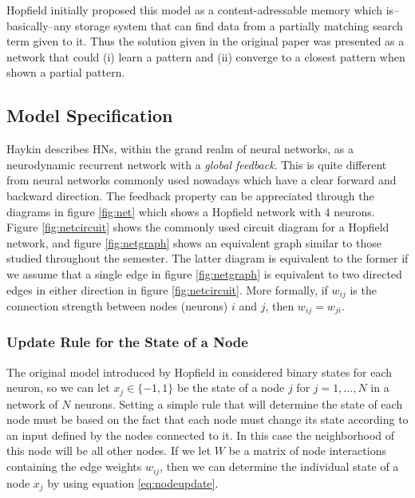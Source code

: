 \documentclass[11pt]{article}
\begin{document}
	Hopfield initially proposed this model as a content-adressable memory which is–basically–any storage system that can find data from a partially matching search term given to it.
	Thus the solution given in the original paper was presented as a network that could (i) learn a pattern and (ii) converge to a closest pattern when shown a partial pattern. 

	\subsection{Model Specification} 
	Haykin \cite{haykin} describes HNs, within the grand realm of neural networks, as a neurodynamic recurrent network with a \textit{global feedback}. 
	This is quite different from neural networks commonly used nowadays \cite{deeplearning2015} which have a clear forward and backward direction.
	The feedback property can be appreciated through the diagrams in figure \ref{fig:net} which shows a Hopfield network with 4 neurons. 
	Figure \ref{fig:netcircuit} shows the commonly used circuit diagram for a Hopfield network, and figure \ref{fig:netgraph} shows an equivalent graph similar to those studied throughout the semester. 
	The latter diagram is equivalent to the former if we assume that a single edge in figure \ref{fig:netgraph} is equivalent to two directed edges in either direction in figure \ref{fig:netcircuit}. 
	More formally, if $w_{ij}$ is the connection strength between nodes (neurons) $i$ and $j$, then $w_{ij} = w_{ji}$.



	\subsubsection{Update Rule for the State of a Node}
	The original model introduced by Hopfield in \cite{hopfield1982neural} considered binary states for each neuron, so we can let $x_j \in \{ -1, 1 \}$ be the state of a node $j$ for $j=1,\ldots ,N$ in a network of $N$ neurons.
	Setting a simple rule that will determine the state of each node must be based on the fact that each node must change its state according to an input defined by the nodes connected to it. 
	In this case the neighborhood of this node will be all other nodes.
	If we let $W$ be a matrix of node interactions containing the edge weights $w_{ij}$, then we can determine the individual state of a node $x_j$ by using equation \ref{eq:nodeupdate}.
	
\end{document}

